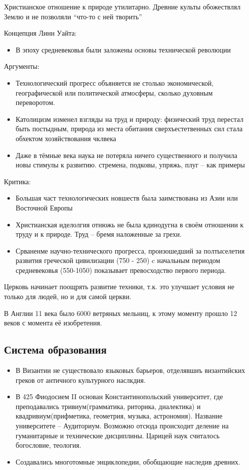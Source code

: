 \documentclass{book}
\theoremstyle{definition}
\begin{document}
    Христианское отношение к природе утилитарно. Древние культы обожествлял Землю и не позволяли ``что-то с ней творить''

    Концепция Линн Уайта:
    \begin{itemize}
        \item В эпоху средневековья были заложены основы технической революции
    \end{itemize}

    Аргументы:
    \begin{itemize}
        \item Технологический прогресс объяняется не столько экономической, географической или политической атмосферы, сколько духовным переворотом.
        \item Католицизм изменел взгляды на труд и природу: физический труд перестал быть постыдным, природа из места обитания сверхъестетвенных сил стала обхектом хозяйствования чклвека
        \item Даже в тёмные века наука не потеряла ничего существенного и получила новы стимулы к развитию.
    стремена, подковы, упряжь, плуг -- как примеры
    \end{itemize}

    Критика:
    \begin{itemize}
        \item Большая част технологических новшеств была заимствована из Азии или Восточной Европы
        \item Христианская иделолгия отнюжь не была кдинодугна в своём отношении к труду и к природе. Труд -- бремя наложенные за грехи.
        \item Срваненме научно-технического прогресса, произошедший за полтыселетия развития греческой цивилизации (750 - 250) c  начальным периодом средневековья (550-1050) показывает превосходство первого периода.
    \end{itemize}

    Церковь начинает поощрять развитие техники, т.к. это улучшает условия не только для людей, но и для самой церкви.

    В Англии 11 века было 6000 ветряных мельниц, к этому моменту прошло 12 веков с момента её изобретения.

    \subsection{Система образования}

    \begin{itemize}
        \item  В Византии не существовало языковых барьеров, отделявшиъ византийских греков от античного культурного наслкдия.
        \item В 425 Фиодосием II основан Константинопольский университет, где преподавались тривиум(грамматика, риторика, диалектика) и квадривиум(прифметика, геометрия, музыка, астрономия). Название университете -- Аудиториум. Возможно отсюда происходит деление на гуманитарные и технические дисциплины. Царицей наук считалось богословие, теология.
        \item Создавались многотомные энциклопедии, обобщающие наследив древних.
    \end{itemize}
\end{document}
